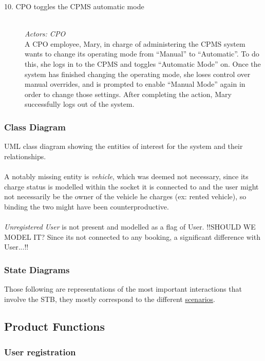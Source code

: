 \documentclass[11pt]{article}
\begin{document}
\begin{description}
    \item [10. CPO toggles the CPMS automatic mode] \hfill \\
        \textit{Actors: CPO} \\
        A CPO employee, Mary, in charge of administering the CPMS system wants to change its operating mode from “Manual” to “Automatic”. To do this, she logs in to the CPMS and toggles “Automatic Mode” on. Once the system has finished changing the operating mode, she loses control over manual overrides, and is prompted to enable “Manual Mode” again in order to change those settings. After completing the action, Mary successfully logs out of the system. \hfill \\
\end{description}

\subsubsection{Class Diagram}

UML class diagram showing the entities of interest for the system and their relationships. \\
\\
A notably missing entity is \textit{vehicle}, which was deemed not necessary, since its charge status is modelled within the socket it is connected to and the user might not necessarily be the owner of the vehicle he charges (ex: rented vehicle), so binding the two might have been counterproductive. \\
\\
\textit{Unregistered User} is not present and modelled as a flag of User. !!SHOULD WE MODEL IT? Since its not connected to any booking, a significant difference with User...!! 

\subsubsection{State Diagrams}

Those following are representations of the most important interactions that involve the STB, they mostly correspond to the different \hyperref[subsubsec:scenarios]{scenarios}.

\subsection{Product Functions}
\label{subsec:prodfunctions}

\subsubsection{User registration}
\end{document}
